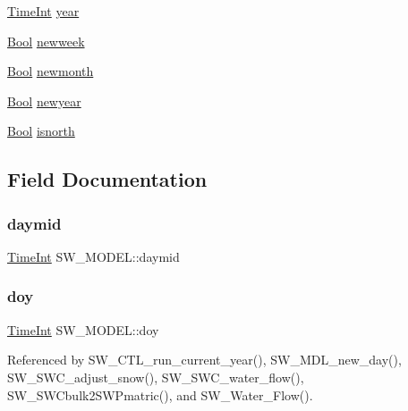 \begin{DoxyCompactItemize}
\item 
\hyperlink{_times_8h_a25ac787161a5cad0e3fdfe5a5aeb3236}{Time\+Int} \hyperlink{struct_s_w___m_o_d_e_l_a3080ab995b14b9e38ef8b41509efc16c}{year}
\item 
\hyperlink{generic_8h_a39db6982619d623273fad8a383489309}{Bool} \hyperlink{struct_s_w___m_o_d_e_l_a946ebc859cba698ceece86f3cb7715ac}{newweek}
\item 
\hyperlink{generic_8h_a39db6982619d623273fad8a383489309}{Bool} \hyperlink{struct_s_w___m_o_d_e_l_af3e628c4ec9aecdc306764c5d49785d2}{newmonth}
\item 
\hyperlink{generic_8h_a39db6982619d623273fad8a383489309}{Bool} \hyperlink{struct_s_w___m_o_d_e_l_aa63d4c1bbd8153d2bc8c73c4a0b415cc}{newyear}
\item 
\hyperlink{generic_8h_a39db6982619d623273fad8a383489309}{Bool} \hyperlink{struct_s_w___m_o_d_e_l_a51a1edc5cab17c7430c95a7522caa2e8}{isnorth}
\end{DoxyCompactItemize}


\subsection{Field Documentation}
\mbox{\label{struct_s_w___m_o_d_e_l_ab3c5fd1e0009d8cb42bda44103a5d22f}} 
\subsubsection{\texorpdfstring{daymid}{daymid}}
{\footnotesize\ttfamily \hyperlink{_times_8h_a25ac787161a5cad0e3fdfe5a5aeb3236}{Time\+Int} S\+W\+\_\+\+M\+O\+D\+E\+L\+::daymid}

\mbox{\label{struct_s_w___m_o_d_e_l_a2fd6957c498589e9208edaac093808ea}} 
\subsubsection{\texorpdfstring{doy}{doy}}
{\footnotesize\ttfamily \hyperlink{_times_8h_a25ac787161a5cad0e3fdfe5a5aeb3236}{Time\+Int} S\+W\+\_\+\+M\+O\+D\+E\+L\+::doy}



Referenced by S\+W\+\_\+\+C\+T\+L\+\_\+run\+\_\+current\+\_\+year(), S\+W\+\_\+\+M\+D\+L\+\_\+new\+\_\+day(), S\+W\+\_\+\+S\+W\+C\+\_\+adjust\+\_\+snow(), S\+W\+\_\+\+S\+W\+C\+\_\+water\+\_\+flow(), S\+W\+\_\+\+S\+W\+Cbulk2\+S\+W\+Pmatric(), and S\+W\+\_\+\+Water\+\_\+\+Flow().


